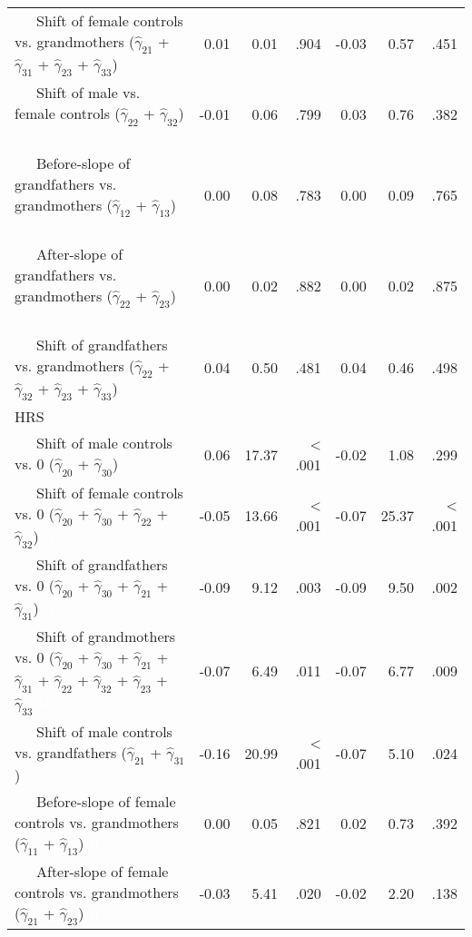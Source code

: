 \documentclass[
  english,
  man, noextraspace]{apa7}
\newenvironment{lltable}{\begin{landscape}\begin{center}\begin{ThreePartTable}}{\end{ThreePartTable}\end{center}\end{landscape}}
\begin{document}
\begin{appendix}
\begin{lltable}
{\begin{longtable}{lrrrrrr}
\ \ \ Shift of female controls vs. grandmothers 
($\hat{\gamma}_{21}$ + $\hat{\gamma}_{31}$ + 
$\hat{\gamma}_{23}$ + $\hat{\gamma}_{33}$) \textcolor{white}{L} & 0.01 & 0.01 & .904 & -0.03 & 0.57 & .451\\
\ \ \ Shift of male vs. female controls 
($\hat{\gamma}_{22}$ + $\hat{\gamma}_{32}$) \textcolor{white}{L} & -0.01 & 0.06 & .799 & 0.03 & 0.76 & .382\\
\ \ \ Before-slope of grandfathers vs. grandmothers 
($\hat{\gamma}_{12}$ + $\hat{\gamma}_{13}$) \textcolor{white}{L} & 0.00 & 0.08 & .783 & 0.00 & 0.09 & .765\\
\ \ \ After-slope of grandfathers vs. grandmothers 
($\hat{\gamma}_{22}$ + $\hat{\gamma}_{23}$) \textcolor{white}{L} & 0.00 & 0.02 & .882 & 0.00 & 0.02 & .875\\
\ \ \ Shift of grandfathers vs. grandmothers 
($\hat{\gamma}_{22}$ + $\hat{\gamma}_{32}$ + 
$\hat{\gamma}_{23}$ + $\hat{\gamma}_{33}$) \textcolor{white}{L} & 0.04 & 0.50 & .481 & 0.04 & 0.46 & .498\\
HRS &  &  &  &  &  & \\
\ \ \ Shift of male controls vs. 0 ($\hat{\gamma}_{20}$ + 
$\hat{\gamma}_{30}$) \textcolor{white}{H} & 0.06 & 17.37 & < .001 & -0.02 & 1.08 & .299\\
\ \ \ Shift of female controls vs. 0 ($\hat{\gamma}_{20}$ + 
$\hat{\gamma}_{30}$ + $\hat{\gamma}_{22}$ + 
$\hat{\gamma}_{32}$) \textcolor{white}{H} & -0.05 & 13.66 & < .001 & -0.07 & 25.37 & < .001\\
\ \ \ Shift of grandfathers vs. 0 ($\hat{\gamma}_{20}$ + 
$\hat{\gamma}_{30}$ + $\hat{\gamma}_{21}$ + 
$\hat{\gamma}_{31}$) \textcolor{white}{H} & -0.09 & 9.12 & .003 & -0.09 & 9.50 & .002\\
\ \ \ Shift of grandmothers vs. 0 ($\hat{\gamma}_{20}$ + 
$\hat{\gamma}_{30}$ + $\hat{\gamma}_{21}$ + 
$\hat{\gamma}_{31}$ + $\hat{\gamma}_{22}$ + 
$\hat{\gamma}_{32}$ + $\hat{\gamma}_{23}$ +
$\hat{\gamma}_{33}$ \textcolor{white}{H} & -0.07 & 6.49 & .011 & -0.07 & 6.77 & .009\\
\ \ \ Shift of male controls vs. grandfathers 
($\hat{\gamma}_{21}$ + $\hat{\gamma}_{31}$) \textcolor{white}{H} & -0.16 & 20.99 & < .001 & -0.07 & 5.10 & .024\\
\ \ \ Before-slope of female controls vs. grandmothers 
($\hat{\gamma}_{11}$ + $\hat{\gamma}_{13}$) \textcolor{white}{H} & 0.00 & 0.05 & .821 & 0.02 & 0.73 & .392\\
\ \ \ After-slope of female controls vs. grandmothers 
($\hat{\gamma}_{21}$ + $\hat{\gamma}_{23}$) \textcolor{white}{H} & -0.03 & 5.41 & .020 & -0.02 & 2.20 & .138\\

\end{longtable}}
\end{lltable}
\end{appendix}
\end{document}
